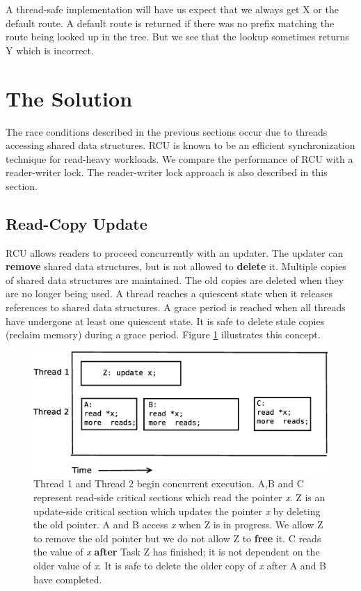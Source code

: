 \documentclass[a4paper,marginparwidth=50pt,marginparsep=10pt]{article}
\begin{document}
A thread-safe implementation will have us expect that we always get X or the default route. A default route is returned if there was no prefix matching the route being looked up in the tree. But we see that the lookup sometimes returns Y which is incorrect.
\section{The Solution}
\label{sec:solution}
The race conditions described in the previous sections occur due to threads accessing shared data structures. RCU is known to be an efficient synchronization technique for read-heavy workloads. We compare the performance of RCU with a reader-writer lock. The reader-writer lock approach is also described in this section.

\subsection{Read-Copy Update}

\label{sec:rcu}

RCU allows readers to proceed concurrently with an updater. The updater can \textbf{remove} shared data structures, but is not allowed to \textbf{delete} it. Multiple copies of shared data structures are maintained. The old copies are deleted when they are no longer being used. A thread reaches a quiescent state when it releases references to shared data structures. A grace period is reached when all threads have undergone at least one quiescent state. It is safe to delete stale copies (reclaim memory) during a grace period. Figure \ref{fig:rcuexp1} illustrates this concept.

\begin{figure}[float=tph]
\begin{center}
\includegraphics[scale=0.4]{../images/diagrams/rcuexp0}
\caption{Thread 1 and Thread 2 begin concurrent execution. A,B and C represent read-side critical sections which read the pointer \emph{x}. Z is an update-side critical section which updates the pointer \emph{x} by deleting the old pointer. A and B access \emph{x} when Z is in progress. We allow Z to remove the old pointer but we do not allow Z to \textbf{free} it. C reads the value of \emph{x} \textbf{after} Task Z has finished; it is not dependent on the older value of \emph{x}. It is safe to delete the older copy of \emph{x} after A and B have completed.}
\label{fig:rcuexp1} 
\end{center}
\end{figure}
\end{document}
